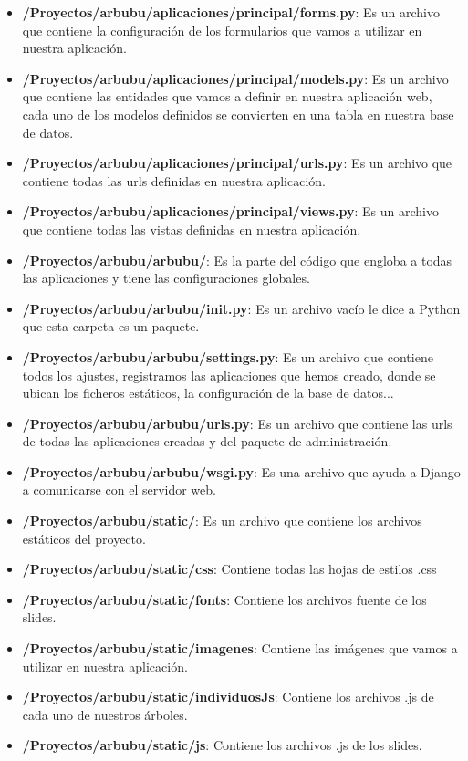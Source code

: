 \begin{itemize}
\begin{itemize}
\begin{itemize}
\begin{itemize}
				\item \textbf{/Proyectos/arbubu/aplicaciones/principal/forms.py}: Es un archivo que contiene la configuración de los formularios que vamos a utilizar en nuestra aplicación.
				\item \textbf{/Proyectos/arbubu/aplicaciones/principal/models.py}: Es un archivo que contiene las entidades que vamos a definir en nuestra aplicación web, cada uno de los modelos definidos se convierten en una tabla en nuestra base de datos. 
				\item \textbf{/Proyectos/arbubu/aplicaciones/principal/urls.py}: Es un archivo que contiene todas las urls definidas en nuestra aplicación.
				\item \textbf{/Proyectos/arbubu/aplicaciones/principal/views.py}: Es un archivo que contiene todas las vistas definidas en nuestra aplicación.
				\item \textbf{/Proyectos/arbubu/arbubu/}: Es la parte del código que engloba a todas las aplicaciones y tiene las configuraciones globales.
				\item \textbf{/Proyectos/arbubu/arbubu/init.py}: Es un archivo vacío le dice a Python que esta carpeta es un paquete.
				\item \textbf{/Proyectos/arbubu/arbubu/settings.py}: Es un archivo que contiene todos los ajustes, registramos las aplicaciones que hemos creado, donde se ubican los ficheros estáticos, la configuración de la base de datos...
				\item \textbf{/Proyectos/arbubu/arbubu/urls.py}: Es un archivo que contiene las urls de todas las aplicaciones creadas y del paquete de administración.
				\item \textbf{/Proyectos/arbubu/arbubu/wsgi.py}: Es una archivo que ayuda a Django a comunicarse con el servidor web.
				\item \textbf{/Proyectos/arbubu/static/}: Es un archivo que contiene los archivos estáticos del proyecto.
				\item \textbf{/Proyectos/arbubu/static/css}: Contiene todas las hojas de estilos .css
				\item \textbf{/Proyectos/arbubu/static/fonts}: Contiene los archivos fuente de los slides.
				\item \textbf{/Proyectos/arbubu/static/imagenes}: Contiene las imágenes que vamos a utilizar en nuestra aplicación.
				\item \textbf{/Proyectos/arbubu/static/individuosJs}: Contiene los archivos .js de cada uno de nuestros árboles.
				\item \textbf{/Proyectos/arbubu/static/js}: Contiene los archivos .js de los slides.

\end{itemize}
\end{itemize}
\end{itemize}
\end{itemize}
